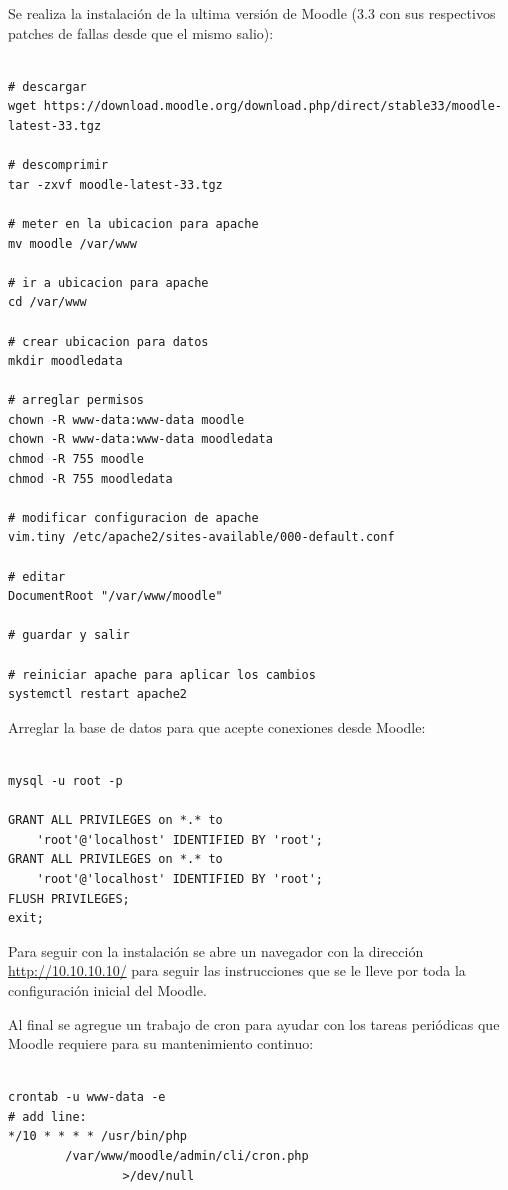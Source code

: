 Se realiza la instalación de la ultima versión de Moodle (3.3 con sus respectivos patches de fallas desde que el mismo salio):

\begin{lstlisting}

# descargar
wget https://download.moodle.org/download.php/direct/stable33/moodle-latest-33.tgz

# descomprimir
tar -zxvf moodle-latest-33.tgz

# meter en la ubicacion para apache
mv moodle /var/www

# ir a ubicacion para apache
cd /var/www

# crear ubicacion para datos
mkdir moodledata

# arreglar permisos
chown -R www-data:www-data moodle
chown -R www-data:www-data moodledata
chmod -R 755 moodle
chmod -R 755 moodledata

# modificar configuracion de apache
vim.tiny /etc/apache2/sites-available/000-default.conf

# editar
DocumentRoot "/var/www/moodle"

# guardar y salir

# reiniciar apache para aplicar los cambios
systemctl restart apache2

\end{lstlisting}

Arreglar la base de datos para que acepte conexiones desde Moodle:

\begin{lstlisting}

mysql -u root -p

GRANT ALL PRIVILEGES on *.* to
	'root'@'localhost' IDENTIFIED BY 'root';
GRANT ALL PRIVILEGES on *.* to
	'root'@'localhost' IDENTIFIED BY 'root';
FLUSH PRIVILEGES;
exit;

\end{lstlisting}

Para seguir con la instalación se abre un navegador con la dirección \url{http://10.10.10.10/} para seguir las instrucciones que se le lleve por toda la configuración inicial del Moodle.

Al final se agregue un trabajo de cron para ayudar con los tareas periódicas que Moodle requiere para su mantenimiento continuo:

\begin{lstlisting}

crontab -u www-data -e
# add line:
*/10 * * * * /usr/bin/php
		/var/www/moodle/admin/cli/cron.php
        		>/dev/null

\end{lstlisting}

